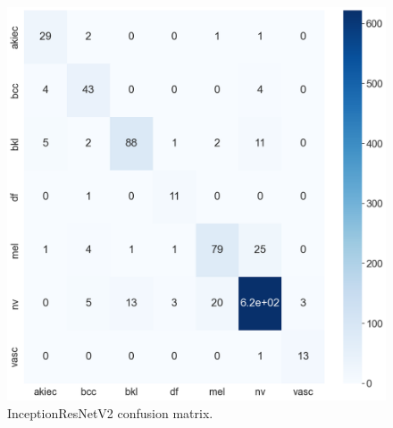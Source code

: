 \documentclass[sensors,article,accept,pdftex,moreauthors]{Definitions/mdpi}
\begin{document}
		\begin{figure}[H]
		\begin{minipage}{0.48\textwidth}
\centering
\includegraphics[width=1\linewidth]{Definitions/CM/irv2cm}
		\end{minipage}
\caption{{InceptionResNetV2} %
 confusion matrix.}\label{fig:irv2cm}
	\end{figure}
	
\end{document}
